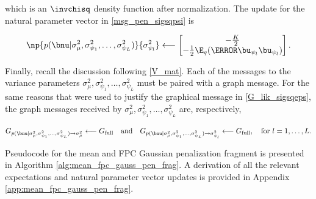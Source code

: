 \documentclass[12pt]{article}
\def\sigsqmu{\sigma^2_{\mu}}
\newcommand\upsi[1]{\bu_{\psi_{#1}}}
\newcommand\sigsqpsi[1]{\sigma^2_{\psi_{#1}}}
\theoremstyle{plain}
\theoremstyle{definition}
\theoremstyle{remark}
\begin{document}
\noindent which is an $\invchisq$ density function after normalization. The update for the natural parameter vector
in \eqref{msg_pen_sigsqpsi} is

\begin{equation}
	\np{p (\bnu | \sigsqmu, \sigsqpsi{1}, \dots, \sigsqpsi{L})}{\sigsqpsi{l}}
		\longleftarrow
			\begin{bmatrix}
				-\frac{K}{2} \\
				-\frac12 \E_q (\T{\upsi{l}} \upsi{l})
			\end{bmatrix}.
\label{np_pen_sigsqpsi}
\end{equation}

Finally, recall the discussion following \eqref{V_mat}. Each of the messages to the variance parameters $\sigsqmu,
\sigsqpsi{1}, \dots, \sigsqpsi{L}$ must be paired with a graph message. For the same reasons that were used to
justify the graphical message in \eqref{G_lik_sigsqeps}, the graph messages received by $\sigsqmu,
\sigsqpsi{1}, \dots, \sigsqpsi{L}$ are, respectively,

\begin{equation}
	G_{p (\bnu | \sigsqmu, \sigsqpsi{1}, \dots, \sigsqpsi{L}) \rightarrow \sigsqmu}
		\longleftarrow
			G_{\text{full}} \quad
	\text{and} \quad
	G_{p (\bnu | \sigsqmu, \sigsqpsi{1}, \dots, \sigsqpsi{L}) \rightarrow \sigsqpsi{l}}
		\longleftarrow
			G_{\text{full}}, \quad \text{for $l = 1, \dots, L$.}
\label{G_pen}
\end{equation}

Pseudocode for the mean and FPC Gaussian penalization fragment is presented in Algorithm
\ref{alg:mean_fpc_gauss_pen_frag}.
A derivation of all the relevant expectations and natural parameter vector updates is provided in Appendix
\ref{app:mean_fpc_gauss_pen_frag}.
\end{document}
